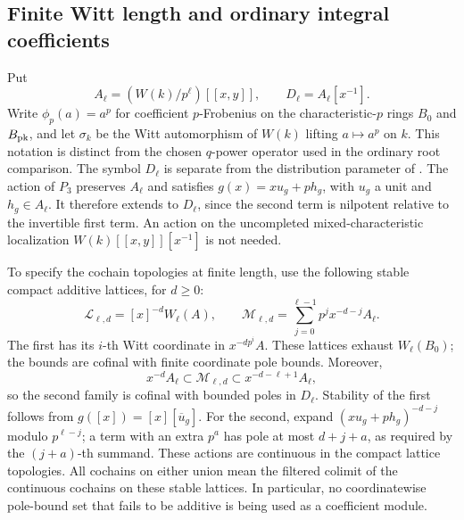 \subsection{Finite Witt length and ordinary integral coefficients}

Put
\[
 A_\ell=(W(k)/p^\ell)[[x,y]],\qquad
 D_\ell=A_\ell[x^{-1}].
\]
Write \(\phi_p(a)=a^p\) for coefficient \(p\)-Frobenius on the
characteristic-\(p\) rings \(B_0\) and \(B_{\mathrm{pk}}\), and let
\(\sigma_k\) be the Witt automorphism of \(W(k)\) lifting
\(a\mapsto a^p\) on \(k\).  This notation is distinct from the
chosen \(q\)-power operator used in the ordinary root comparison.
The symbol \(D_\ell\) is separate from the distribution parameter
of .
The action of \(P_3\) preserves \(A_\ell\) and satisfies
\(g(x)=xu_g+ph_g\), with \(u_g\) a unit and \(h_g\in A_\ell\).
It therefore extends to \(D_\ell\), since the second term
is nilpotent relative to the invertible first term.
An action on the uncompleted mixed-characteristic
localization \(W(k)[[x,y]][x^{-1}]\) is not needed.

To specify the cochain topologies at finite length, use
the following stable compact additive lattices, for \(d\geq0\):
\begin{equation}\label{h3:des:witt-pole-lattices}
 \mathcal L_{\ell,d}=[x]^{-d}W_\ell(A),\qquad
 \mathcal M_{\ell,d}
       =\sum_{j=0}^{\ell-1}p^j x^{-d-j}A_\ell.
\end{equation}
The first has its \(i\)-th Witt coordinate in
\(x^{-dp^i}A\).  These lattices exhaust \(W_\ell(B_0)\);
the bounds are cofinal with finite coordinate pole bounds.
Moreover,
\[
 x^{-d}A_\ell\subset\mathcal M_{\ell,d}
       \subset x^{-d-\ell+1}A_\ell,
\]
so the second family is cofinal with bounded poles in
\(D_\ell\).  Stability of the first follows from
\(g([x])=[x][\overline u_g]\).
For the second, expand \((xu_g+ph_g)^{-d-j}\)
modulo \(p^{\ell-j}\); a term with an extra \(p^a\)
has pole at most \(d+j+a\), as required by the
\((j+a)\)-th summand.  These actions are continuous
in the compact lattice topologies.
All cochains on either union mean the filtered colimit
of the continuous cochains on these stable lattices.
In particular, no coordinatewise pole-bound set that
fails to be additive is being used as a coefficient module.


